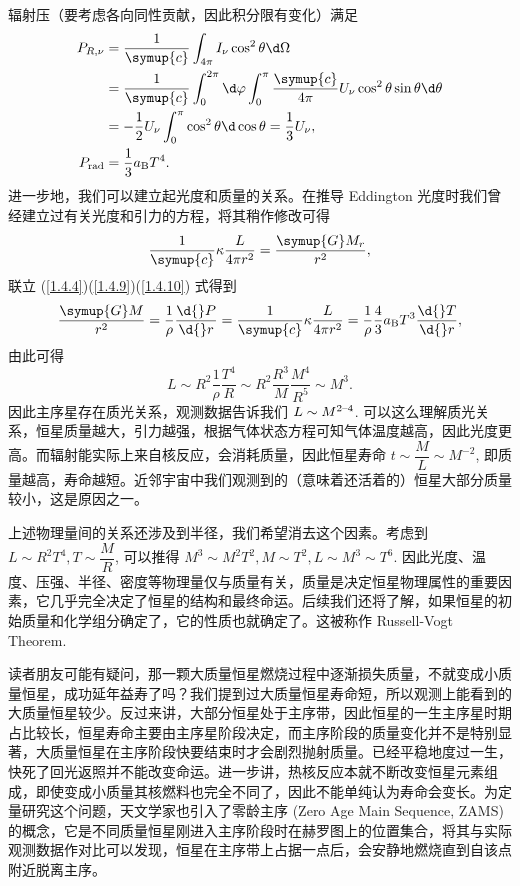 \documentclass[../天体物理基础.tex]{subfiles}
\begin{document}
辐射压（要考虑各向同性贡献，因此积分限有变化）满足
\begin{align}
P_{R,\nu}&=\frac{1}{\symup{c}}\int_{4\pi{}}I_{\nu}\cos^{2}{\theta}\d\Omega\notag\\
&=\frac{1}{\symup{c}}\int_{0}^{2\pi{}}\d\varphi\int_{0}^{\pi}\frac{\symup{c}}{4\pi{}}U_{\nu}\cos^{2}{\theta}\sin{\theta}\d\theta\notag\\
&=-\frac{1}{2}U_{\nu}\int_{0}^{\pi}\cos^{2}{\theta}\d\cos{\theta}=\frac{1}{3}U_{\nu},\notag\\
P_{\mathrm{rad}}&=\frac{1}{3}a_{\mathrm{B}}T^{4}.\label{1.4.9}
\end{align}
进一步地，我们可以建立起光度和质量的关系。在推导 Eddington 光度时我们曾经建立过有关光度和引力的方程，将其稍作修改可得
\begin{equation}
\frac{1}{\symup{c}}\kappa\frac{L}{4\pi r^{2}}=\frac{\symup{G}M_{r}}{r^{2}},\label{1.4.10}
\end{equation}
联立 (\ref{1.4.4})(\ref{1.4.9})(\ref{1.4.10}) 式得到
\begin{align}
\frac{\symup{G}M}{r^{2}}=\frac{1}{\rho}\frac{\d{}P}{\d{}r}=\frac{1}{\symup{c}}\kappa\frac{L}{4\pi r^{2}}=\frac{1}{\rho}\frac{4}{3}a_{\mathrm{B}}T^{3}\frac{\d{}T}{\d{}r},\label{1.4.11}
\end{align}
由此可得
\begin{equation}
L\sim R^{2}\frac{1}{\rho}\frac{T^{4}}{R}\sim R^{2}\frac{R^{3}}{M}\frac{M^{4}}{R^{5}}\sim M^{3}.
\end{equation}
因此主序星存在质光关系，观测数据告诉我们 $L\sim M^{2\text{\textendash}4}$. 可以这么理解质光关系，恒星质量越大，引力越强，根据气体状态方程可知气体温度越高，因此光度更高。而辐射能实际上来自核反应，会消耗质量，因此恒星寿命 $t\sim\dfrac{M}{L}\sim M^{-2}$, 即质量越高，寿命越短。近邻宇宙中我们观测到的（意味着还活着的）恒星大部分质量较小，这是原因之一。

上述物理量间的关系还涉及到半径，我们希望消去这个因素。考虑到 $L\sim R^{2}T^{4}, T\sim\dfrac{M}{R}$, 可以推得 $M^{3}\sim M^{2}T^{2}, M\sim T^{2}, L\sim M^{3}\sim T^{6}$. 因此光度、温度、压强、半径、密度等物理量仅与质量有关，质量是决定恒星物理属性的重要因素，它几乎完全决定了恒星的结构和最终命运。后续我们还将了解，如果恒星的初始质量和化学组分确定了，它的性质也就确定了。这被称作 Russell-Vogt Theorem.

读者朋友可能有疑问，那一颗大质量恒星燃烧过程中逐渐损失质量，不就变成小质量恒星，成功延年益寿了吗？我们提到过大质量恒星寿命短，所以观测上能看到的大质量恒星较少。反过来讲，大部分恒星处于主序带，因此恒星的一生主序星时期占比较长，恒星寿命主要由主序星阶段决定，而主序阶段的质量变化并不是特别显著，大质量恒星在主序阶段快要结束时才会剧烈抛射质量。已经平稳地度过一生，快死了回光返照并不能改变命运。进一步讲，热核反应本就不断改变恒星元素组成，即使变成小质量其核燃料也完全不同了，因此不能单纯认为寿命会变长。为定量研究这个问题，天文学家也引入了零龄主序 (Zero Age Main Sequence, ZAMS) 的概念，它是不同质量恒星刚进入主序阶段时在赫罗图上的位置集合，将其与实际观测数据作对比可以发现，恒星在主序带上占据一点后，会安静地燃烧直到自该点附近脱离主序。
\end{document}
